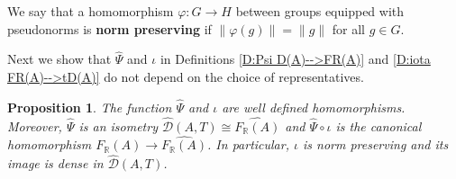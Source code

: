 \documentclass[12pt]{amsart}
\newtheorem{prop}{Proposition}[section]
\theoremstyle{definition}
\def\RR{\ensuremath{\mathbb{R}}}
\def\Free{F}
\def\D{\mathcal{D}}
\def\tD{\hat{\D}}
\begin{document}
We say that a homomorphism $\varphi \colon G \to H$ between groups equipped with pseudonorms is {\bf norm preserving} if $\|\varphi(g)\|=\| g\|$ for all $g \in G$.

Next we show that $\hat{\Psi}$ and $\iota$ in Definitions \ref{D:Psi D(A)-->FR(A)} and \ref{D:iota FR(A)-->tD(A)} do not depend on the choice of representatives.




\begin{prop}\label{P:properties Psi iota} %
The function $\hat{\Psi}$ and $\iota$ are well defined homomorphisms.
Moreover, $\hat{\Psi}$ is an isometry $\tD(A,T) \cong \widehat{\Free_\RR(A)}$ and $\hat{\Psi} \circ \iota$ is the canonical homomorphism $\Free_\RR(A) \to \widehat{\Free_\RR(A)}$.
In particular, $\iota$ is norm preserving and its image is dense in $\tD(A,T)$.
\end{prop}
\end{document}
